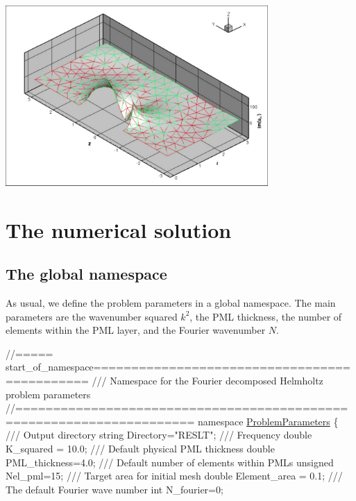  
\begin{DoxyImage}
\includegraphics[width=0.75\textwidth]{soln3_imag}
\end{DoxyImage}




\hypertarget{index_num_soln}{}\section{The numerical solution}\label{index_num_soln}
\hypertarget{index_glb_name}{}\subsection{The global namespace}\label{index_glb_name}
As usual, we define the problem parameters in a global namespace. The main parameters are the wavenumber squared $ k^2 $, the P\+ML thickness, the number of elements within the P\+ML layer, and the Fourier wavenumber $ N $.

 
\begin{DoxyCodeInclude}
\textcolor{comment}{//===== start\_of\_namespace=============================================}
\textcolor{comment}{/// Namespace for the Fourier decomposed Helmholtz problem parameters}
\textcolor{comment}{}\textcolor{comment}{//=====================================================================}
\textcolor{keyword}{namespace }\hyperlink{namespaceProblemParameters}{ProblemParameters}
\{\textcolor{comment}{}
\textcolor{comment}{ /// Output directory}
\textcolor{comment}{} \textcolor{keywordtype}{string} Directory=\textcolor{stringliteral}{"RESLT"};
\textcolor{comment}{}
\textcolor{comment}{ /// Frequency}
\textcolor{comment}{} \textcolor{keywordtype}{double} K\_squared = 10.0;
\textcolor{comment}{}
\textcolor{comment}{ /// Default physical PML thickness}
\textcolor{comment}{} \textcolor{keywordtype}{double} PML\_thickness=4.0;
\textcolor{comment}{}
\textcolor{comment}{ /// Default number of elements within PMLs}
\textcolor{comment}{} \textcolor{keywordtype}{unsigned} Nel\_pml=15;
\textcolor{comment}{}
\textcolor{comment}{ /// Target area for initial mesh}
\textcolor{comment}{} \textcolor{keywordtype}{double} Element\_area = 0.1;
\textcolor{comment}{}
\textcolor{comment}{ /// The default Fourier wave number}
\textcolor{comment}{} \textcolor{keywordtype}{int} N\_fourier=0;

\end{DoxyCodeInclude}


